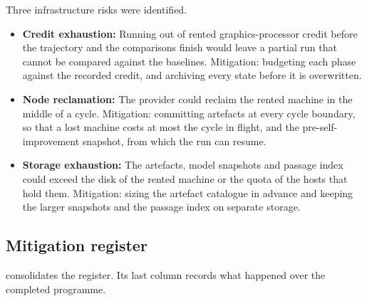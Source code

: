 Three infrastructure risks were identified.
\begin{itemize}
    \item \textbf{Credit exhaustion:} Running out of rented graphics-processor credit before the trajectory and the comparisons finish would leave a partial run that cannot be compared against the baselines. Mitigation: budgeting each phase against the recorded credit, and archiving every state before it is overwritten.
    \item \textbf{Node reclamation:} The provider could reclaim the rented machine in the middle of a cycle. Mitigation: committing artefacts at every cycle boundary, so that a lost machine costs at most the cycle in flight, and the pre-self-improvement snapshot, from which the run can resume.
    \item \textbf{Storage exhaustion:} The artefacts, model snapshots and passage index could exceed the disk of the rented machine or the quota of the hosts that hold them. Mitigation: sizing the artefact catalogue in advance and keeping the larger snapshots and the passage index on separate storage.
\end{itemize}

\subsection{Mitigation register}
\label{sec:risk-mitigation}

 consolidates the register. Its last column records what happened over the completed programme.

